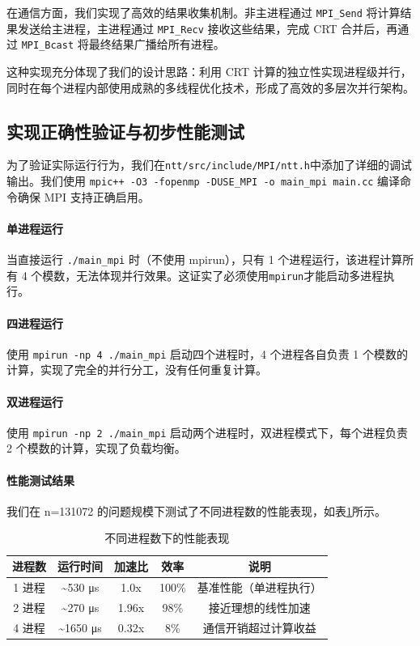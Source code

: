 \documentclass[a4paper]{article}
\begin{document}
在通信方面，我们实现了高效的结果收集机制。非主进程通过 \texttt{MPI\_Send} 将计算结果发送给主进程，主进程通过 \texttt{MPI\_Recv} 接收这些结果，完成 CRT 合并后，再通过 \texttt{MPI\_Bcast} 将最终结果广播给所有进程。

这种实现充分体现了我们的设计思路：利用 CRT 计算的独立性实现进程级并行，同时在每个进程内部使用成熟的多线程优化技术，形成了高效的多层次并行架构。

\subsection{实现正确性验证与初步性能测试}

为了验证实际运行行为，我们在\texttt{ntt/src/include/MPI/ntt.h}中添加了详细的调试输出。我们使用 \texttt{mpic++ -O3 -fopenmp -DUSE\_MPI -o main\_mpi main.cc} 编译命令确保 MPI 支持正确启用。

\paragraph{单进程运行}

当直接运行 \texttt{./main\_mpi} 时（不使用 mpirun），只有 1 个进程运行，该进程计算所有 4 个模数，无法体现并行效果。这证实了必须使用\texttt{mpirun}才能启动多进程执行。

\paragraph{四进程运行}

使用 \texttt{mpirun -np 4 ./main\_mpi} 启动四个进程时，4 个进程各自负责 1 个模数的计算，实现了完全的并行分工，没有任何重复计算。

\paragraph{双进程运行}

使用 \texttt{mpirun -np 2 ./main\_mpi} 启动两个进程时，双进程模式下，每个进程负责 2 个模数的计算，实现了负载均衡。

\paragraph{性能测试结果}

我们在 n=131072 的问题规模下测试了不同进程数的性能表现，如表\ref{table:t1}所示。

\begin{table} 
\centering
\caption{不同进程数下的性能表现}
\begin{tabular}{ccccc}
\toprule
进程数 & 运行时间 & 加速比 & 效率 & 说明 \\
\midrule
1 进程 & \~{}530 μs & 1.0x & 100\% & 基准性能（单进程执行） \\
2 进程 & \~{}270 μs & 1.96x & 98\% & 接近理想的线性加速 \\
4 进程 & \~{}1650 μs & 0.32x & 8\% & 通信开销超过计算收益 \\
\bottomrule
\end{tabular}
\label{table:t1}
\end{table}
\end{document}
